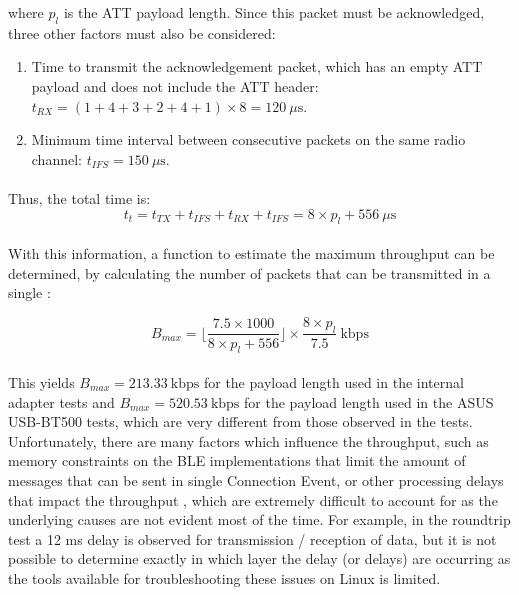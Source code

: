 where $p_{l}$ is the \acs{ATT} payload length. Since this packet must be acknowledged, three other factors must also be considered: 

\begin{enumerate}
    \item Time to transmit the acknowledgement packet, which has an empty \acs{ATT} payload and does not include the \acs{ATT} header: $t_{RX} = (1+4+3+2+4+1)\times 8 = 120\ \mu\text{s}$.
    \item Minimum time interval between consecutive packets on the same radio channel: $t_{IFS} = 150\ \mu\text{s}$.
\end{enumerate}

\paragraph{} Thus, the total time is:
\begin{equation}
    t_{t} = t_{TX}+ t_{IFS}+ t_{RX} + t_{IFS} =  8\times p_l  + 556\ \mu\text{s}
\end{equation}

\paragraph{} With this information, a function to estimate the maximum throughput can be determined, by calculating the number of packets that can be transmitted in a single :

\begin{equation}
    B_{max} = \bigg\lfloor \frac{7.5\times 1000}{8\times p_l  + 556} \bigg\rfloor\times \frac{8\times p_l}{7.5}\ \text{kbps}
\end{equation}

\paragraph{} This yields $B_{max}=213.33\ \text{kbps}$ for the payload length used in the internal adapter tests and $B_{max}=520.53\ \text{kbps}$ for the payload length used in the ASUS USB-BT500 tests, which are very different from those observed in the tests. Unfortunately, there are many factors which influence the throughput, such as memory constraints on the \acs{BLE} implementations that limit the amount of messages that can be sent in single Connection Event, or other processing delays that impact the throughput \cite{Gomez2012}, which are extremely difficult to account for as the underlying causes are not evident most of the time. For example, in the roundtrip test a 12 ms delay is observed for transmission / reception of data, but it is not possible to determine exactly in which layer the delay (or delays) are occurring as the tools available for troubleshooting these issues on Linux is limited.

